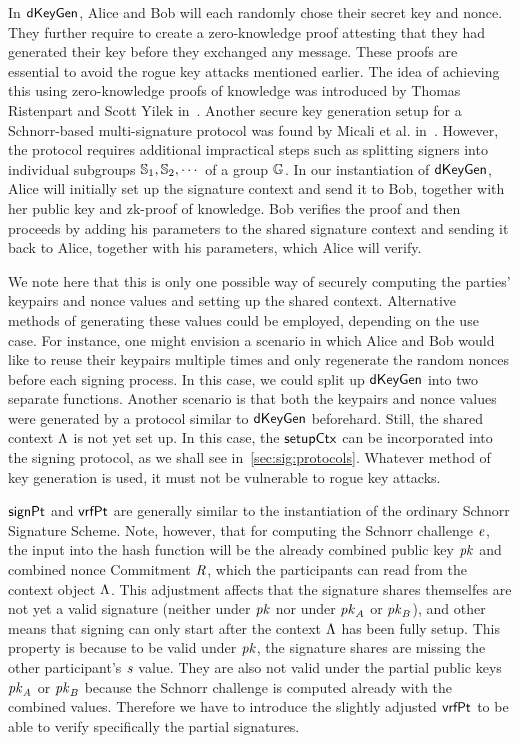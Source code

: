 In $\mathsf{dKeyGen}$, Alice and Bob will each randomly chose their secret key and nonce.
They further require to create a zero-knowledge proof attesting that they had generated their key before they exchanged any message.
These proofs are essential to avoid the rogue key attacks mentioned earlier.
The idea of achieving this using zero-knowledge proofs of knowledge was introduced by Thomas Ristenpart and Scott Yilek in~\cite{ristenpart2007power}.
Another secure key generation setup for a Schnorr-based multi-signature protocol was found by Micali et al. in~\cite{micali2001accountable}.
However, the protocol requires additional impractical steps such as splitting signers into individual subgroups $\mathbb{S}_1, \mathbb{S}_{2}, \cdots$ of a group $\mathbb{G}$.
In our instantiation of $\mathsf{dKeyGen}$, Alice will initially set up the signature context and send it to Bob, together with her public key and zk-proof of knowledge.
Bob verifies the proof and then proceeds by adding his parameters to the shared signature context and sending it back to Alice, together with his parameters, which Alice will verify.

We note here that this is only one possible way of securely computing the parties' keypairs and nonce values and setting up the shared context.
Alternative methods of generating these values could be employed, depending on the use case.
For instance, one might envision a scenario in which Alice and Bob would like to reuse their keypairs multiple times and only regenerate the random nonces before each signing process.
In this case, we could split up $\mathsf{dKeyGen}$ into two separate functions.
Another scenario is that both the keypairs and nonce values were generated by a protocol similar to $\mathsf{dKeyGen}$ beforehard.
Still, the shared context $\Lambda$ is not yet set up.
In this case, the $\mathsf{setupCtx}$ can be incorporated into the signing protocol, as we shall see in~\cref{sec:sig:protocols}.
Whatever method of key generation is used, it must not be vulnerable to rogue key attacks.

$\mathsf{signPt}$ and $\mathsf{vrfPt}$ are generally similar to the instantiation of the ordinary Schnorr Signature Scheme.
Note, however, that for computing the Schnorr challenge $\mathit{e}$, the input into the hash function will be the already combined public key $\mathit{pk}$ and combined nonce Commitment $\mathit{R}$, which the participants can read from the context object $\Lambda$.
This adjustment affects that the signature shares themselfes are not yet a valid signature (neither under $\mathit{pk}$ nor under $\mathit{pk}_{\mathit{A}}$ or $\mathit{pk}_{\mathit{B}}$), and other means that signing can only start after the context $\Lambda$ has been fully setup.
This property is because to be valid under $\mathit{pk}$, the signature shares are missing the other participant's $\mathit{s}$ value.
They are also not valid under the partial public keys $\mathit{pk}_{\mathit{A}}$ or $\mathit{pk}_{\mathit{B}}$ because the Schnorr challenge is computed already with the combined values.
Therefore we have to introduce the slightly adjusted $\mathsf{vrfPt}$ to be able to verify specifically the partial signatures.


